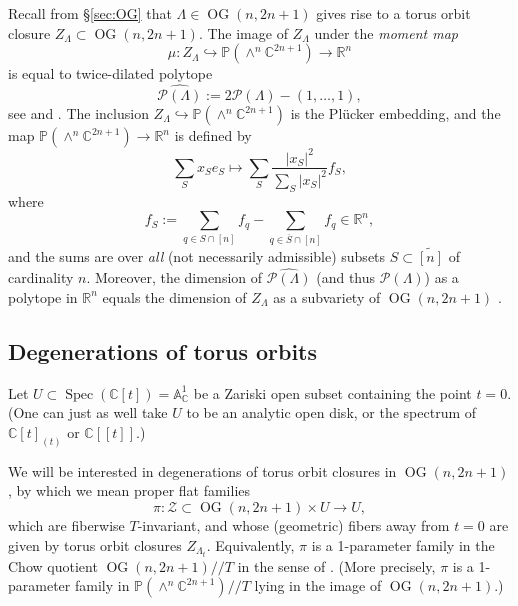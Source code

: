 \documentclass[12pt]{amsart}
\DeclareMathOperator{\OG}{OG}
\DeclareMathOperator{\Spec}{Spec}
\newcommand{\bA}{\mathbb{A}}
\newcommand{\bC}{\mathbb{C}}
\newcommand{\bP}{\mathbb{P}}
\newcommand{\cP}{\mathcal{P}}
\newcommand{\bR}{\mathbb{R}}
\newcommand{\cZ}{\mathcal{Z}}
\newcommand{\wtn}{\widetilde{[n]}}
\begin{document}
Recall from \S\ref{sec:OG} that $\Lambda\in\OG(n,2n+1)$ gives rise to a torus orbit closure $Z_\Lambda\subset\OG(n,2n+1)$. The image of $Z_\Lambda$ under the \emph{moment map}
\begin{equation*}
    \mu:Z_\Lambda\hookrightarrow \bP(\wedge^n\bC^{2n+1})\to\bR^{n}
\end{equation*}
is equal to twice-dilated polytope
\begin{equation*}
\widehat{\cP(\Lambda)}:=2\cP(\Lambda)-(1,\ldots,1),
\end{equation*}
see \cite[Proposition 6.2]{efls} and \cite[\S 5.2, Proposition 1]{gs}. The inclusion $Z_\Lambda\hookrightarrow \bP(\wedge^n\bC^{2n+1})$ is the Pl\"{u}cker embedding, and the map $\bP(\wedge^n\bC^{2n+1})\to\bR^{n}$ is defined by
\begin{equation*}
    \sum_{S} x_Se_S\mapsto \sum_{S}\frac{|x_S|^2}{\sum_{S}|x_S|^2}f_S,
\end{equation*}
where 
\begin{equation*}
    f_S:=\sum_{q\in S\cap[n]}f_q-\sum_{q\in \overline{S}\cap [n]}f_{q}\in\bR^n,
\end{equation*}
and the sums are over \emph{all} (not necessarily admissible) subsets $S\subset\wtn$ of cardinality $n$. Moreover, the dimension of $\widehat{\cP(\Lambda)}$ (and thus $\cP(\Lambda)$) as a polytope in $\bR^n$ equals the dimension of $Z_\Lambda$ as a subvariety of $\OG(n,2n+1)$ \cite[\S 3.2, Theorem 1]{gs}.

\subsection{Degenerations of torus orbits}\label{sec:prelim_degen}

Let $U\subset\Spec(\bC[t])=\bA^1_\bC$ be a Zariski open subset containing the point $t=0$. (One can just as well take $U$ to be an analytic open disk, or the spectrum of  $\bC[t]_{(t)}$ or $\bC[[t]]$.)

We will be interested in degenerations of torus orbit closures in $\OG(n,2n+1)$, by which we mean proper flat families
\begin{equation*}
    \pi:\cZ\subset \OG(n,2n+1)\times U\to U,
\end{equation*}
which are fiberwise $T$-invariant, and whose (geometric) fibers away from $t=0$ are given by torus orbit closures $Z_{\Lambda_t}$. Equivalently, $\pi$ is a 1-parameter family in the Chow quotient $\OG(n,2n+1)//T$ in the sense of \cite{ksz}. (More precisely, $\pi$ is a 1-parameter family in $\bP(\wedge^n\bC^{2n+1})//T$ lying in the image of $\OG(n,2n+1)$.)
\end{document}
